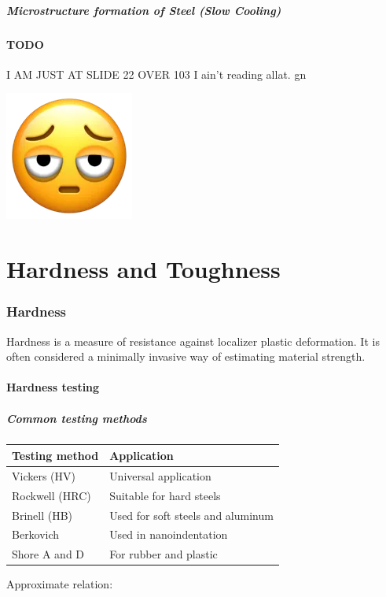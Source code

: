 \documentclass{article}
\begin{document}
\subsubsection{Microstructure formation of Steel (Slow Cooling)}

\subsection{\color{red}TODO}
I AM JUST AT SLIDE 22 OVER 103 I ain't reading allat. gn
\begin{center}
  \includegraphics[width=.3\textwidth]{media/bruh.png}
\end{center}

\newpage
\part{Hardness and Toughness}
\section{Hardness}
Hardness is a measure of resistance against localizer plastic deformation. It is often
considered a minimally invasive way of estimating material strength.

\subsection{Hardness testing}
\subsubsection{Common testing methods}
\begin{table}[h!]
  \centering
  \begin{tabular}{|l|l|}
    \hline
    \textbf{Testing method} & \textbf{Application}\\
    \hline
    Vickers (HV) & Universal application\\
    \hline
    Rockwell (HRC) & Suitable for hard steels\\
    \hline
    Brinell (HB) & Used for soft steels and aluminum\\
    \hline
    Berkovich & Used in nanoindentation\\
    \hline
    Shore A and D & For rubber and plastic\\
    \hline
  \end{tabular}
\end{table}
\vspace*{.5cm}
Approximate relation:
\end{document}
